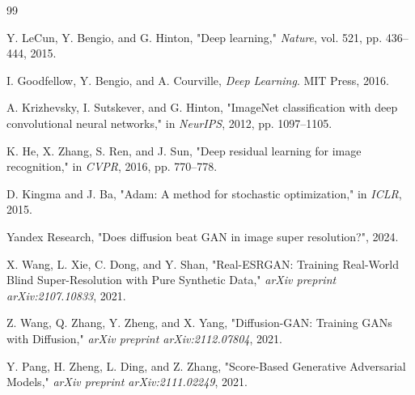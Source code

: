 \documentclass[conference]{IEEEtran}
\begin{document}
\begin{thebibliography}{99}

 Y. LeCun, Y. Bengio, and G. Hinton, "Deep learning," \textit{Nature}, vol. 521, pp. 436--444, 2015.

 I. Goodfellow, Y. Bengio, and A. Courville, \textit{Deep Learning}. MIT Press, 2016.

 A. Krizhevsky, I. Sutskever, and G. Hinton, "ImageNet classification with deep convolutional neural networks," in \textit{NeurIPS}, 2012, pp. 1097--1105.

 K. He, X. Zhang, S. Ren, and J. Sun, "Deep residual learning for image recognition," in \textit{CVPR}, 2016, pp. 770--778.

 D. Kingma and J. Ba, "Adam: A method for stochastic optimization," in \textit{ICLR}, 2015.

 Yandex Research, "Does diffusion beat GAN in image super resolution?", 2024.

 X. Wang, L. Xie, C. Dong, and Y. Shan, "Real-ESRGAN: Training Real-World Blind Super-Resolution with Pure Synthetic Data," \textit{arXiv preprint arXiv:2107.10833}, 2021.

 Z. Wang, Q. Zhang, Y. Zheng, and X. Yang, "Diffusion-GAN: Training GANs with Diffusion," \textit{arXiv preprint arXiv:2112.07804}, 2021.

 Y. Pang, H. Zheng, L. Ding, and Z. Zhang, "Score-Based Generative Adversarial Models," \textit{arXiv preprint arXiv:2111.02249}, 2021.

\end{thebibliography}
\end{document}
